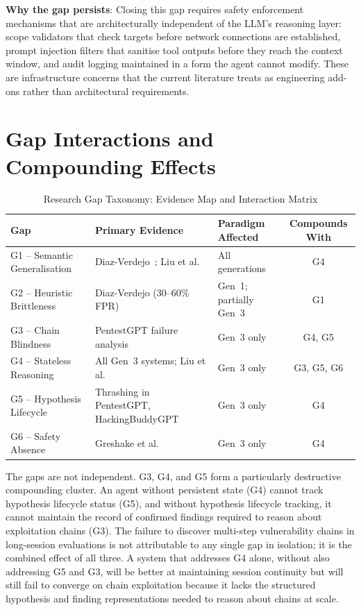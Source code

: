 \documentclass[12pt,a4paper,oneside,openany]{book}
\begin{document}
\textbf{Why the gap persists}: Closing this gap requires safety enforcement mechanisms that are architecturally independent of the LLM's reasoning layer: scope validators that check targets before network connections are established, prompt injection filters that sanitise tool outputs before they reach the context window, and audit logging maintained in a form the agent cannot modify. These are infrastructure concerns that the current literature treats as engineering add-ons rather than architectural requirements.

\vspace{0.4cm}

\section{Gap Interactions and Compounding Effects}

\begin{table}[H]
\centering
\caption{Research Gap Taxonomy: Evidence Map and Interaction Matrix}
\label{tab:gaps}
\begin{tabularx}{\textwidth}{@{}lXXc@{}}
\toprule
\textbf{Gap} & \textbf{Primary Evidence} & \textbf{Paradigm Affected} & \textbf{Compounds With} \\
\midrule
G1 -- Semantic Generalisation & Diaz-Verdejo~\citep{diaz2022evaluation}; Liu et al.~\citep{liu2024gpts} & All generations & G4 \\
G2 -- Heuristic Brittleness   & Diaz-Verdejo (30--60\% FPR)~\citep{diaz2022evaluation} & Gen~1; partially Gen~3 & G1 \\
G3 -- Chain Blindness          & PentestGPT failure analysis~\citep{deng2024pentestgpt} & Gen~3 only & G4, G5 \\
G4 -- Stateless Reasoning      & All Gen~3 systems; Liu et al.~\citep{liu2023lost} & Gen~3 only & G3, G5, G6 \\
G5 -- Hypothesis Lifecycle     & Thrashing in PentestGPT, HackingBuddyGPT~\citep{happe2023hackerllm} & Gen~3 only & G4 \\
G6 -- Safety Absence           & Greshake et al.~\citep{greshake2023indirect} & Gen~3 only & G4 \\
\bottomrule
\end{tabularx}
\end{table}

The gaps are not independent. G3, G4, and G5 form a particularly destructive compounding cluster. An agent without persistent state (G4) cannot track hypothesis lifecycle status (G5), and without hypothesis lifecycle tracking, it cannot maintain the record of confirmed findings required to reason about exploitation chains (G3). The failure to discover multi-step vulnerability chains in long-session evaluations is not attributable to any single gap in isolation; it is the combined effect of all three. A system that addresses G4 alone, without also addressing G5 and G3, will be better at maintaining session continuity but will still fail to converge on chain exploitation because it lacks the structured hypothesis and finding representations needed to reason about chains at scale.
\end{document}
